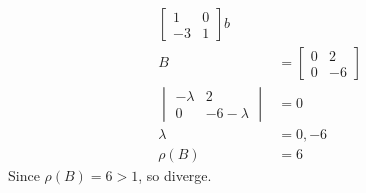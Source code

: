 \documentclass{article}
\begin{document}
\begin{enumerate}
\begin{enumerate}
\begin{itemize}
\begin{align*}
\begin{bmatrix}
1&0\\-3&1
\end{bmatrix}b\\
B &= \begin{bmatrix}
0&2\\0&-6
\end{bmatrix}\\
\begin{vmatrix}
-\lambda&2\\0&-6-\lambda
\end{vmatrix}&=0\\
\lambda &= 0, -6\\
\rho(B)&= 6
\end{align*}
Since $\rho(B)=6 >1$, so diverge.
\end{itemize}
\end{enumerate}
\end{enumerate}
\end{document}
